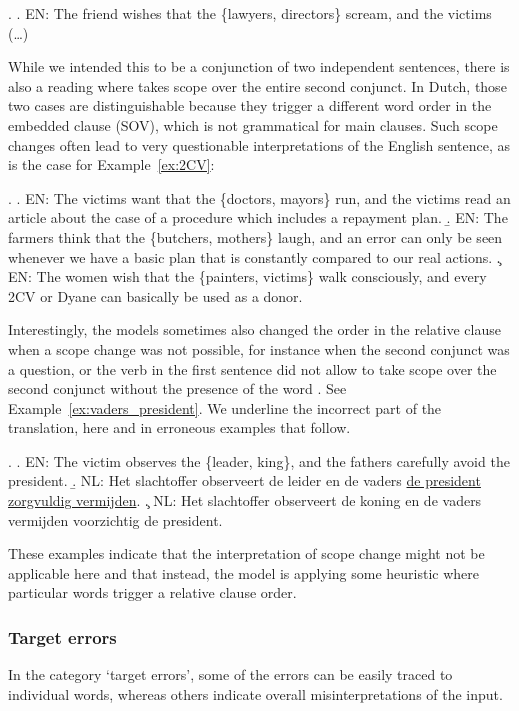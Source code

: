 \ex.\label{ex:director}
\a. \textsc{EN}: The friend wishes that the \{lawyers, directors\} scream, and the victims (\dots)

While we intended this to be a conjunction of two independent sentences, there is also a reading where  takes scope over the entire second conjunct.
In Dutch, those two cases are distinguishable because they trigger a different word order in the embedded clause (SOV), which is not grammatical for main clauses.
Such scope changes often lead to very questionable interpretations of the English sentence, as is the case for Example~\ref{ex:2CV}:

\ex.\label{ex:2CV}
\a. \textsc{EN}: The victims want that the \{doctors, mayors\} run, and the victims read an article about the case of a procedure which includes a repayment plan.
\b. \textsc{EN}: The farmers think that the \{butchers, mothers\} laugh, and an error can only be seen whenever we have a basic plan that is constantly compared to our real actions.
\c. \textsc{EN}: The women wish that the \{painters, victims\} walk consciously, and every 2CV or Dyane can basically be used as a donor.

Interestingly, the models sometimes also changed the order in the relative clause when a scope change was not possible, for instance when the second conjunct was a question, or the verb in the first sentence did not allow to take scope over the second conjunct without the presence of the word .
See Example~\ref{ex:vaders_president}. We underline the incorrect part of the translation, here and in erroneous examples that follow.

\ex. \label{ex:vaders_president}
\a. \textsc{EN}: The victim observes the \{leader, king\}, and the fathers carefully avoid the president.
\b. \textsc{NL}: Het slachtoffer observeert de leider en de vaders \underline{de president zorgvuldig vermijden}.
\c. \textsc{NL}: Het slachtoffer observeert de koning en de vaders vermijden voorzichtig de president.

These examples indicate that the interpretation of scope change might not be applicable here and that instead, the model is applying some heuristic where particular words trigger a relative clause order.

\subsubsection{Target errors}
In the category `target errors', some of the errors can be easily traced to individual words, whereas others indicate overall misinterpretations of the input.

